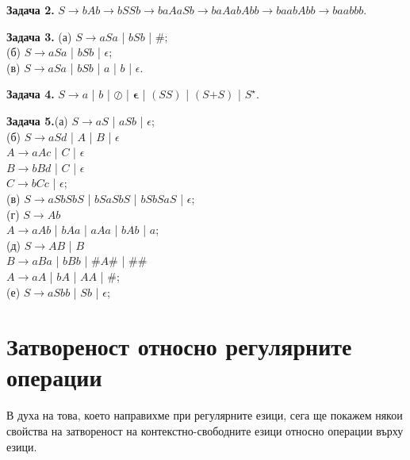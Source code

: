 \documentclass[openany]{book}
\newcommand{\bleft}{
    \boldsymbol{\left(\right.}
}
\newcommand{\bright}{
    \boldsymbol{\left.\right)}
}
\newcommand{\bplus}{
    \boldsymbol{+}
}
\newcommand{\bepsilon}{
    \boldsymbol{\epsilon}
}
\begin{document}
    \vspace{15pt}

    \textbf{Задача 2.} $S \rightarrow bAb \rightarrow bSSb \rightarrow baAaSb \rightarrow baAabAbb \rightarrow baabAbb \rightarrow baabbb$.

    \vspace{15pt}

    \textbf{Задача 3.} (а) $S \rightarrow aSa$ | $bSb$ | $\#$; \\
    (б) $S \rightarrow aSa$ | $bSb$ | $\epsilon$; \\
    (в) $S \rightarrow aSa$ | $bSb$ | $a$ | $b$ | $\epsilon$.

    \vspace{15pt}

    \textbf{Задача 4.} $S \rightarrow a$ | $b$ | $\oslash$ | $\bepsilon$ | $\bleft SS \bright$ | $\bleft S \bplus S \bright$ | $S^\star$.

    \vspace{15pt}

    \textbf{Задача 5.}(а) $S \rightarrow aS$ | $aSb$ | $\epsilon$; \\
    \vspace{5pt}
    (б) $S \rightarrow aSd$ | $A$ | $B$ | $\epsilon$ \\
    $A \rightarrow aAc$ | $C$ | $\epsilon$ \\
    $B \rightarrow bBd$ | $C$ | $\epsilon$ \\
    $C \rightarrow bCc$ | $\epsilon$; \\
    \vspace{5pt}
    (в) $S \rightarrow aSbSbS$ | $bSaSbS$ | $bSbSaS$ | $\epsilon$; \\
    \vspace{5pt}
    (г) $S \rightarrow Ab$ \\
    $A \rightarrow aAb$ | $bAa$ | $aAa$ | $bAb$ | $a$; \\
    \vspace{5pt}
    (д) $S \rightarrow AB$ | $B$ \\
    $B \rightarrow aBa$ | $bBb$ | $\#A\#$ | $\#\#$ \\
    $A \rightarrow aA$ | $bA$ | $AA$ | $\#$; \\
    \vspace{5pt}
    (е) $S \rightarrow aSbb$ | $Sb$ | $\epsilon$;

    \section{Затвореност относно регулярните операции}
    \hspace{15pt}В духа на това, което направихме при регулярните езици, сега ще покажем някои 
    свойства на затвореност на контекстно-свободните езици относно операции върху
    езици.
\end{document}
